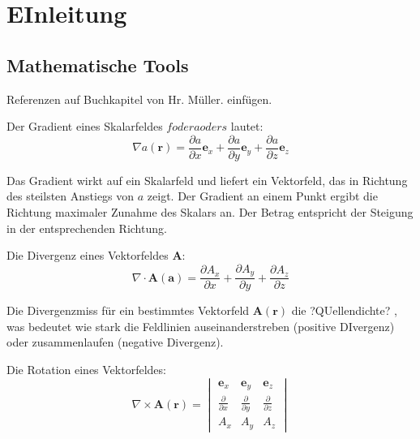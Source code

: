 %
%
%
%
\section{EInleitung\label{helmholtz:section:teil0}}

\subsection{Mathematische Tools}

Referenzen auf Buchkapitel von Hr. Müller. einfügen.

Der Gradient eines Skalarfeldes $f oder a oder s$ lautet:
\begin{equation}
\nabla a(\mathbf{r}) = \frac{\partial a}{\partial x}\mathbf{e}_x + \frac{\partial a}{\partial y}\mathbf{e}_y + \frac{\partial a}{\partial z}\mathbf{e}_z
\end{equation}

Das Gradient wirkt auf ein Skalarfeld und liefert ein Vektorfeld, das in Richtung des steilsten Anstiegs von $a$ zeigt. Der Gradient an einem Punkt ergibt die Richtung maximaler Zunahme des Skalars an. Der Betrag entspricht der Steigung in der entsprechenden Richtung.


Die Divergenz eines Vektorfeldes $\mathbf{A}$:
\begin{equation}
\nabla \cdot \mathbf{A}(\mathbf{a}) = \frac{\partial A_x}{\partial x} + \frac{\partial A_y}{\partial y} + \frac{\partial A_z}{\partial z}
\end{equation}

Die Divergenzmiss für ein bestimmtes Vektorfeld $\mathbf{A}(\mathbf{r})$ die ?QUellendichte? , was bedeutet wie stark die Feldlinien auseinanderstreben (positive DIvergenz) oder zusammenlaufen (negative Divergenz). 


Die Rotation eines Vektorfeldes:
\begin{equation}
\nabla \times \mathbf{A}(\mathbf{r}) = \begin{vmatrix}
	\mathbf{e}_x & \mathbf{e}_y & \mathbf{e}_z \\
	\frac{\partial}{\partial x} & \frac{\partial}{\partial y} & \frac{\partial}{\partial z}\\
	A_x & A_y & A_z
\end{vmatrix}
\end{equation}

